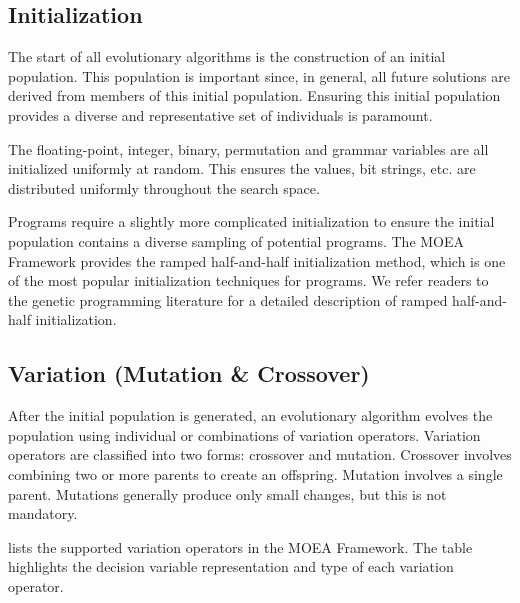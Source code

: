 \subsection{Initialization}
The start of all evolutionary algorithms is the construction of an initial population.  This population is important since, in general, all future solutions are derived from members of this initial population.  Ensuring this initial population provides a diverse and representative set of individuals is paramount.

The floating-point, integer, binary, permutation and grammar variables are all initialized uniformly at random.  This ensures the values, bit strings, etc. are distributed uniformly throughout the search space.

Programs require a slightly more complicated initialization to ensure the initial population contains a diverse sampling of potential programs.  The MOEA Framework provides the ramped half-and-half initialization method, which is one of the most popular initialization techniques for programs.  We refer readers to the genetic programming literature for a detailed description of ramped half-and-half initialization.

\subsection{Variation (Mutation \& Crossover)}
After the initial population is generated, an evolutionary algorithm evolves the population using individual or combinations of variation operators.  Variation operators are classified into two forms: crossover and mutation.  Crossover involves combining two or more parents to create an offspring.  Mutation involves a single parent.  Mutations generally produce only small changes, but this is not mandatory.

 lists the supported variation operators in the MOEA Framework.  The table highlights the decision variable representation and type of each variation operator.

